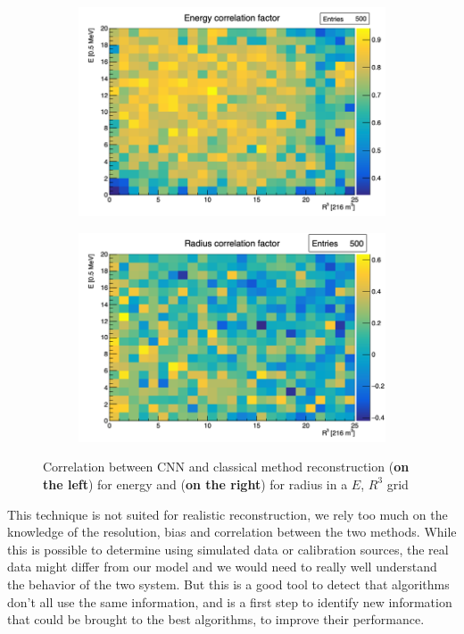 \documentclass[../main.tex]{subfiles}
\begin{document}
\begin{figure}
  \centering
  \begin{subfigure}[t]{0.48\linewidth}
    \includegraphics[width=\linewidth]{images/jcnn/vic_cnn/vic_cnn_e_corr.png}
  \end{subfigure}
  \hfill
  \begin{subfigure}[t]{0.48\linewidth}
    \includegraphics[width=\linewidth]{images/jcnn/vic_cnn/vic_cnn_r_corr.png}
  \end{subfigure}
  \caption{Correlation between CNN and classical method reconstruction (\textbf{on the left}) for energy and (\textbf{on the right}) for radius in a $E$, $R^3$ grid}
  \label{fig:jcnn:vic_cnn:corr}
\end{figure}

This technique is not suited for realistic reconstruction, we rely too much on the knowledge of the resolution, bias and correlation between the two methods. While this is possible to determine using simulated data or calibration sources, the real data might differ from our model and we would need to really well understand the behavior of the two system. But this is a good tool to detect that algorithms don't all use the same information, and is a first step to identify new information that could be brought to the best algorithms, to improve their performance.
\end{document}
